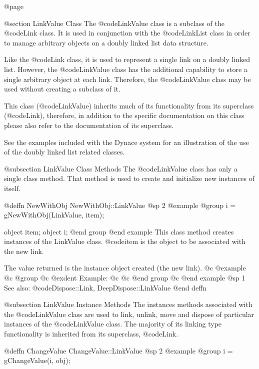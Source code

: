 @page

@section LinkValue Class
The @code{LinkValue} class is a subclass of the @code{Link} class.  It is
used in conjunction with the @code{LinkList} class in order to manage
arbitrary objects on a doubly linked list data structure.

Like the @code{Link} class, it is used to represent a single link on a
doubly linked list.  However, the @code{LinkValue} class has the
additional capability to store a single arbitrary object at each link.
Therefore, the @code{LinkValue} class may be used without creating a
subclass of it.

This class (@code{LinkValue}) inherits much of its functionality from its
superclass (@code{Link}), therefore, in addition to the specific
documentation on this class please also refer to the documentation of
its superclass.

See the examples included with the Dynace system for an illustration of the
use of the doubly linked list related classes.



@subsection LinkValue Class Methods
The @code{LinkValue} class has only a single class method.  That method
is used to create and initialize new instances of itself.




@deffn {NewWithObj} NewWithObj::LinkValue
@sp 2
@example
@group
i = gNewWithObj(LinkValue, item);

object  item;
object  i;
@end group
@end example
This class method creates instances of the LinkValue class.  @code{item}
is the object to be associated with the new link.  

The value returned is the instance object created (the new link).
@c @example
@c @group
@c @exdent Example:
@c 
@c @end group
@c @end example
@sp 1
See also:  @code{Dispose::Link, DeepDispose::LinkValue}
@end deffn






@subsection LinkValue Instance Methods
The instances methods associated with the @code{LinkValue} class are used to
link, unlink, move and dispose of particular instances of the
@code{LinkValue} class.  The majority of its linking type functionality
is inherited from its superclass, @code{Link}.








@deffn {ChangeValue} ChangeValue::LinkValue
@sp 2
@example
@group
i = gChangeValue(i, obj);

